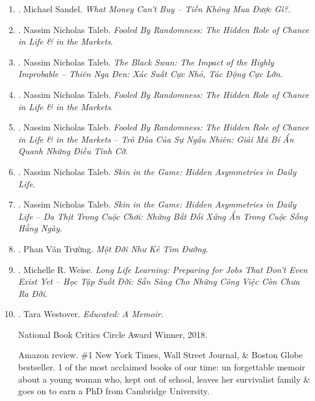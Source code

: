 \documentclass{article}
\begin{document}
\begin{enumerate}
	\item \cite{Sandel_money}. {\sc Michael Sandel}. {\it What Money Can't Buy -- Tiền Không Mua Được Gì?}.\hfill{\sf[done]}

	\item \cite{Taleb_randomness}. {\sc Nassim Nicholas Taleb}. {\it Fooled By Randomness: The Hidden Role of Chance in Life \& in the Markets}.\hfill{\sf[reading]}

	\item \cite{Taleb_black_swan_VN}. {\sc Nassim Nicholas Taleb}. {\it The Black Swan: The Impact of the Highly Improbable -- Thiên Nga Đen: Xác Suất Cực Nhỏ, Tác Động Cực Lớn}.\hfill{\sf[done]}

	\item \cite{Taleb_randomness}. {\sc Nassim Nicholas Taleb}. {\it Fooled By Randomness: The Hidden Role of Chance in Life \& in the Markets}.

	\item \cite{Taleb_randomness_VN}. {\sc Nassim Nicholas Taleb}. {\it Fooled By Randomness: The Hidden Role of Chance in Life \& in the Markets -- Trò Đùa Của Sự Ngẫu Nhiên: Giải Mã Bí Ẩn Quanh Những Điều Tình Cờ}.\hfill{\sf[done]}

	\item \cite{Taleb_skin_game}. {\sc Nassim Nicholas Taleb}. {\it Skin in the Game: Hidden Asymmetries in Daily Life}.

	\item \cite{Taleb_skin_game_VN}. {\sc Nassim Nicholas Taleb}. {\it Skin in the Game: Hidden Asymmetries in Daily Life -- Da Thịt Trong Cuộc Chơi: Những Bất Đối Xứng Ẩn Trong Cuộc Sống Hằng Ngày}.\hfill{\sf[done]}

	\item \cite{Truong_ke_tim_duong}. {\sc Phan Văn Trường}. {\it Một Đời Như Kẻ Tìm Đường}.\hfill{\sf[done]}
	
	\item \cite{Weise_long_life_learning_VN}. {\sc Michelle R. Weise}. {\it Long Life Learning: Preparing for Jobs That Don't Even Exist Yet -- Học Tập Suốt Đời: Sẵn Sàng Cho Những Công Việc Còn Chưa Ra Đời}.\hfill{\sf[done]}

	\item \cite{Westover_educated}. {\sc Tara Westover}. {\it Educated: A Memoir.} {}

	National Book Critics Circle Award Winner, 2018.

	{\sf Amazon review.} \#1 New York Times, Wall Street Journal, \& Boston Globe bestseller. 1 of the most acclaimed books of our time: un forgettable memoir about a young woman who, kept out of school, leaves her survivalist family \& goes on to earn a PhD from Cambridge University.


\end{enumerate}
\end{document}
